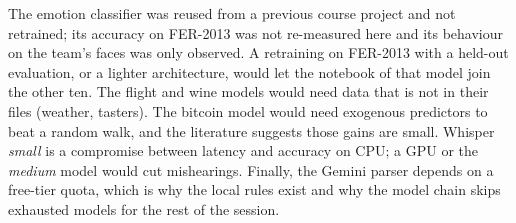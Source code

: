 The emotion classifier was reused from a previous course project and not
retrained; its accuracy on FER-2013 was not re-measured here and its
behaviour on the team's faces was only observed. A retraining on FER-2013
with a held-out evaluation, or a lighter architecture, would let the
notebook of that model join the other ten. The flight and wine models
would need data that is not in their files (weather, tasters). The bitcoin
model would need exogenous predictors to beat a random walk, and the
literature suggests those gains are small. Whisper \emph{small} is a
compromise between latency and accuracy on CPU; a GPU or the \emph{medium}
model would cut mishearings. Finally, the Gemini parser depends on a
free-tier quota, which is why the local rules exist and why the model chain
skips exhausted models for the rest of the session.
